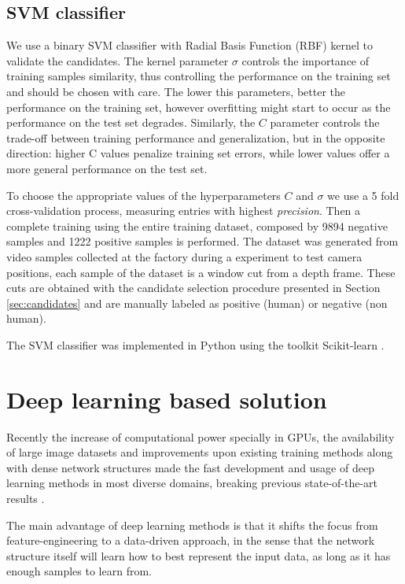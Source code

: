     \subsection{SVM classifier}
      We use a binary SVM classifier with Radial Basis Function (RBF) kernel to validate the candidates. The kernel parameter $\sigma$ controls the importance of training samples similarity, thus controlling the performance on the training set and should be chosen with care. The lower this parameters, better the performance on the training set, however overfitting might start to occur as the performance on the test set degrades. Similarly, the $C$ parameter controls the trade-off between training performance and generalization, but in the opposite direction: higher C values penalize training set errors, while lower values offer a more general performance on the test set.

      To choose the appropriate values of the hyperparameters $C$ and $\sigma$ we use a 5 fold cross-validation process, measuring entries with highest \textit{precision}. Then a complete training using the entire training dataset, composed by 9894 negative samples and 1222 positive samples is performed. The dataset was generated from video samples collected at the factory during a experiment to test camera positions, each sample of the dataset is a window cut from a depth frame. These cuts are obtained with the candidate selection procedure presented in Section \ref{sec:candidates} and are manually labeled as positive (human) or negative (non human).

      The SVM classifier was implemented in Python using the toolkit Scikit-learn \cite{scikit-learn}.


\section{Deep learning based solution}
\label{sec:deep}

    Recently the increase of computational power specially in GPUs, the availability of large image datasets and improvements upon existing training methods \cite{nair2010relu} along with dense network structures \cite{NIPS2013_5207} made the fast development and usage of deep learning methods in most diverse domains, breaking previous state-of-the-art results \cite{hintonCONVNET}.

    The main advantage of deep learning methods is that it shifts the focus from feature-engineering to a data-driven approach, in the sense that the network structure itself will learn how to best represent the input data, as long as it has enough samples to learn from.

